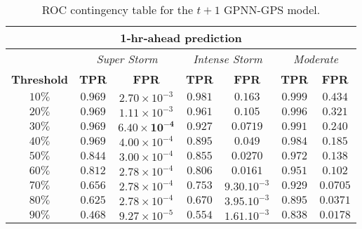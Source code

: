 \begin{table}[ht]
	\centering
	\caption{ROC contingency table for the $t+1$ GPNN-GPS model.}
	\label{table:rocgpnn1h}
	\begin{tabular}{c| c c | c c | c c}
		\hline
		\multicolumn{7}{c}{\textbf{1‐hr‐ahead prediction}} \\ 
		\hline
		 & \multicolumn{2}{c}{\textit{Super Storm}} & \multicolumn{2}{c}{\textit{Intense Storm}} & \multicolumn{2}{c}{\textit{Moderate}} \\ 
		\hline
		\textbf{Threshold} & \textbf{TPR} & \textbf{FPR} & \textbf{TPR} & \textbf{FPR} & \textbf{TPR} & \textbf{FPR} \\ 
		\hline
		$10\%$ & $0.969$ & $2.70\times10^{-3}$ & $0.981$ & $0.163$ & $0.999$ &$ 0.434$ \\ 
		$20\%$ & $0.969$ & $1.11\times10^{-3}$ & $0.961$ & $0.105$ & $0.996$ & $0.321$ \\ 
		$30\%$ & $\mathbf{0.969}$ & $\mathbf{6.40\times10^{-4}}$ & $\mathbf{0.927}$ & $\mathbf{0.0719}$ & $0.991$ & $0.240$ \\ 
		$40\%$ & $0.969$ & $4.00\times10^{-4}$ & $0.895$ & $0.049$ & $0.984$ & $0.185$ \\ 
		$50\%$ & $0.844$ & $3.00\times10^{-4}$ & $0.855$ & $0.0270$ & $0.972$ & $0.138$ \\ 
		$60\%$ & $0.812$ & $2.78\times10^{-4}$ & $0.806$ & $0.0161$ & $0.951$ & $0.102$ \\ 
		$70\%$ & $0.656$ & $2.78\times10^{-4}$ & $0.753$ & $9.30.10^{-3}$ & $\mathbf{0.929}$ & $\mathbf{0.0705}$ \\ 
		$80\%$ & $0.625$ & $2.78\times10^{-4}$ & $0.670$ & $3.95.10^{-3}$ & $0.895$ & $0.0371$ \\ 
		$90\%$ & $0.468$ & $9.27\times10^{-5}$ & $0.554$ & $1.61.10^{-3}$ & $0.838$ & $0.0178$\\
		\hline
	\end{tabular}
	
\end{table}

